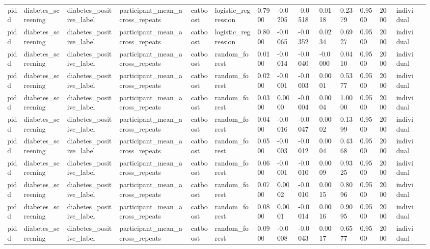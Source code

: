 \begin{tabular}{lllllllllllllll}
pidd & diabetes\_screening & diabetes\_positive\_label & participant\_mean\_across\_repeats & catboost & logistic\_regression & 0.7900 & -0.0205 & -0.0518 & 0.0118 & 0.2379 & 0.9500 & 2000 & individual &  \\
pidd & diabetes\_screening & diabetes\_positive\_label & participant\_mean\_across\_repeats & catboost & logistic\_regression & 0.8000 & -0.0065 & -0.0352 & 0.0234 & 0.6927 & 0.9500 & 2000 & individual &  \\
pidd & diabetes\_screening & diabetes\_positive\_label & participant\_mean\_across\_repeats & catboost & random\_forest & 0.0100 & -0.0014 & -0.0040 & -0.0000 & 0.0410 & 0.9500 & 2000 & individual &  \\
pidd & diabetes\_screening & diabetes\_positive\_label & participant\_mean\_across\_repeats & catboost & random\_forest & 0.0200 & -0.0001 & -0.0003 & 0.0001 & 0.5377 & 0.9500 & 2000 & individual &  \\
pidd & diabetes\_screening & diabetes\_positive\_label & participant\_mean\_across\_repeats & catboost & random\_forest & 0.0300 & 0.0000 & -0.0004 & 0.0004 & 1.0000 & 0.9500 & 2000 & individual &  \\
pidd & diabetes\_screening & diabetes\_positive\_label & participant\_mean\_across\_repeats & catboost & random\_forest & 0.0400 & -0.0016 & -0.0047 & 0.0002 & 0.1399 & 0.9500 & 2000 & individual &  \\
pidd & diabetes\_screening & diabetes\_positive\_label & participant\_mean\_across\_repeats & catboost & random\_forest & 0.0500 & -0.0003 & -0.0012 & 0.0004 & 0.4368 & 0.9500 & 2000 & individual &  \\
pidd & diabetes\_screening & diabetes\_positive\_label & participant\_mean\_across\_repeats & catboost & random\_forest & 0.0600 & -0.0001 & -0.0010 & 0.0009 & 0.9325 & 0.9500 & 2000 & individual &  \\
pidd & diabetes\_screening & diabetes\_positive\_label & participant\_mean\_across\_repeats & catboost & random\_forest & 0.0700 & 0.0002 & -0.0010 & 0.0015 & 0.8096 & 0.9500 & 2000 & individual &  \\
pidd & diabetes\_screening & diabetes\_positive\_label & participant\_mean\_across\_repeats & catboost & random\_forest & 0.0800 & 0.0001 & -0.0014 & 0.0016 & 0.9095 & 0.9500 & 2000 & individual &  \\
pidd & diabetes\_screening & diabetes\_positive\_label & participant\_mean\_across\_repeats & catboost & random\_forest & 0.0900 & -0.0008 & -0.0043 & 0.0017 & 0.6577 & 0.9500 & 2000 & individual &  \\

\end{tabular}
